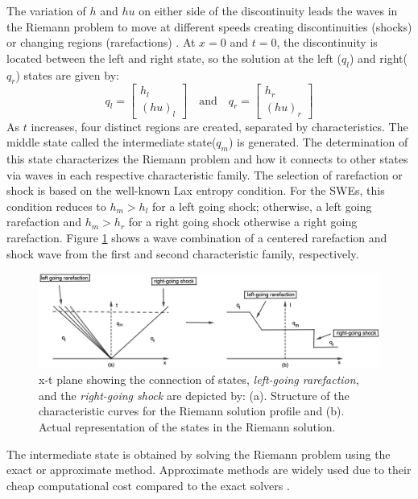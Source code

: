 \documentclass[10pt,a4paper]{article}
\begin{document}
	The variation of $h$ and $hu$ on either side of the discontinuity leads the waves in the Riemann problem to move at different speeds creating discontinuities (shocks) or changing regions (rarefactions) \cite{leveque2002finite}.  At $x = 0$ and $t = 0$,   the discontinuity is located between the left and right state, so the solution at the left ($q_{l}$) and right($q_{r}$) states are given by: 
	\begin{equation}
		q_{l} = \begin{bmatrix}
			h_{l} \\( hu)_{l}
		\end{bmatrix}  \quad \text{and} \quad q_{r} = \begin{bmatrix}
			h_{r} \\( hu)_{r}
		\end{bmatrix} 
		\label{ic}
	\end{equation}
	As $t$ increases, four distinct regions are created, separated by characteristics. The middle state called the intermediate state($q_{m}$) is generated.  The determination of this state characterizes the Riemann problem and how it connects to other states via waves in each respective characteristic family.  The selection of rarefaction or shock is based on the well-known Lax entropy condition.   For the SWEs, this condition reduces to $h_m > h_l$ for a left going shock; otherwise, a left going rarefaction and $h_m>h_r$ for a right going shock otherwise a right going rarefaction.    Figure \ref{fig:x-tplane} shows a wave combination of a centered rarefaction and shock wave from the first and second characteristic family, respectively.
	
	\begin{figure}[H]
		\centering
		\includegraphics[width=.8\linewidth]{images/geo11}
		\caption{ x-t plane showing the connection of states, {\em left-going rarefaction}, and the {\em right-going shock} are depicted by: (a). Structure of the characteristic curves for the  Riemann solution profile and (b). Actual representation of the states in the Riemann solution.}
		\label{fig:x-tplane}
	\end{figure}
	The intermediate state is obtained by solving the Riemann problem using the exact or approximate method. Approximate methods are widely used due to their cheap computational cost compared to the exact solvers \cite{roe1981approximate}.
	
\end{document}
